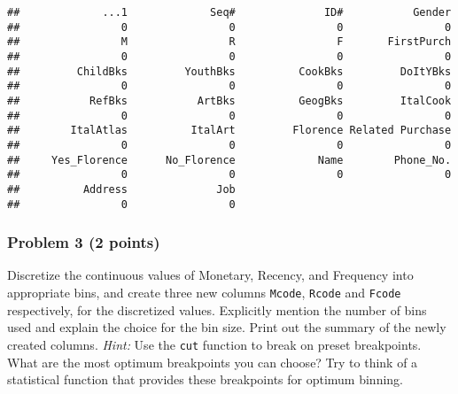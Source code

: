 \documentclass[
]{article}
\newenvironment{Shaded}{\begin{snugshade}}{\end{snugshade}}
\newcommand{\AttributeTok}[1]{\textcolor[rgb]{0.77,0.63,0.00}{#1}}
\newcommand{\DecValTok}[1]{\textcolor[rgb]{0.00,0.00,0.81}{#1}}
\newcommand{\FunctionTok}[1]{\textcolor[rgb]{0.00,0.00,0.00}{#1}}
\newcommand{\NormalTok}[1]{#1}
\newcommand{\OtherTok}[1]{\textcolor[rgb]{0.56,0.35,0.01}{#1}}
\newcommand{\SpecialCharTok}[1]{\textcolor[rgb]{0.00,0.00,0.00}{#1}}
\begin{document}
\begin{verbatim}
##             ...1             Seq#              ID#           Gender 
##                0                0                0                0 
##                M                R                F       FirstPurch 
##                0                0                0                0 
##         ChildBks         YouthBks          CookBks         DoItYBks 
##                0                0                0                0 
##           RefBks           ArtBks          GeogBks         ItalCook 
##                0                0                0                0 
##        ItalAtlas          ItalArt         Florence Related Purchase 
##                0                0                0                0 
##     Yes_Florence      No_Florence             Name        Phone_No. 
##                0                0                0                0 
##          Address              Job 
##                0                0
\end{verbatim}

\hypertarget{problem-3-2-points}{%
\subsubsection{Problem 3 (2 points)}\label{problem-3-2-points}}

Discretize the continuous values of Monetary, Recency, and Frequency
into appropriate bins, and create three new columns \texttt{Mcode},
\texttt{Rcode} and \texttt{Fcode} respectively, for the discretized
values. Explicitly mention the number of bins used and explain the
choice for the bin size. Print out the summary of the newly created
columns. \emph{Hint:} Use the \texttt{cut} function to break on preset
breakpoints. What are the most optimum breakpoints you can choose? Try
to think of a statistical function that provides these breakpoints for
optimum binning.

\begin{Shaded}
\end{Shaded}
\end{document}
